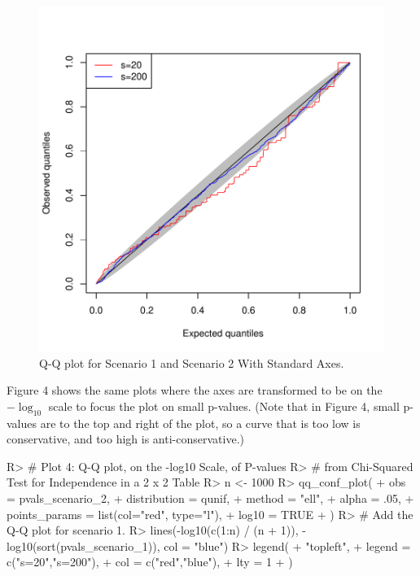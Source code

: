 \documentclass[article]{jss}
\begin{document}
\begin{figure}
\begin{center}
\includegraphics{manuscript-chisq_qq}
\end{center}
\caption{Q-Q plot for Scenario 1 and Scenario 2 With Standard Axes.}
\end{figure}

Figure 4 shows the same plots where the axes are transformed to be on the $-\log_{10}$ scale to focus the plot on small p-values. (Note that in Figure 4, small p-values are to the top and right of the plot, so a curve that is too low is conservative, and too high is anti-conservative.)  

\begin{Schunk}
\begin{Sinput}
R> # Plot 4: Q-Q plot, on the -log10 Scale, of P-values 
R> # from Chi-Squared Test for Independence in a 2 x 2 Table
R> n <- 1000
R> qq_conf_plot(
+    obs = pvals_scenario_2,
+    distribution = qunif,
+    method = "ell",
+    alpha = .05,
+    points_params = list(col="red", type="l"),
+    log10 = TRUE
+  )
R> # Add the Q-Q plot for scenario 1.
R> lines(-log10(c(1:n) / (n + 1)), -log10(sort(pvals_scenario_1)), col = "blue")
R> legend(
+    "topleft",
+    legend = c("s=20","s=200"), 
+    col = c("red","blue"), 
+    lty = 1
+  )
\end{Sinput}
\end{Schunk}
\end{document}
